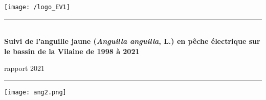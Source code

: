 \documentclass[10pt,twocolumn,titlepage,twoside]{article}\usepackage[]{graphicx}\usepackage[]{color}
\begin{document}
\newpage
{}
\thispagestyle{empty}
\pagecolor{bleu_EV}
\begin{minipage}{\textwidth}
\vspace{30pt}
\hspace{30pt}
\texttt{[image: /logo\_EV1]}
\end{minipage}

\begin{minipage}{0.1\textwidth}
\phantom{This text will be invisible}
\end{minipage}
\begin{minipage}{0.8\textwidth}
\begin{center}
\noindent
{\color{turquoise_EV}\rule{\textwidth}{2.5pt}}\\
\vspace{8mm}
\color{white}
\color{white}
{ \titlefont \huge  \bfseries{Suivi de l'anguille jaune (\textit{Anguilla anguilla}, L.) en pêche
électrique sur le bassin de la Vilaine de 1998 à 2021\\
    }}
\bigskip
{\titlefont  \LARGE rapport 2021\par }
\vspace{4mm}\noindent
{\color{turquoise_EV}\rule{0.9\textwidth}{1.8pt}}\par
\vspace{5mm}
{}
\end{center}
\end{minipage}



\vspace{2cm}%

\begin{minipage}{\textwidth}
\begin{center}
\texttt{[image: ang2.png]}
\end{center}
\end{minipage}

\vspace{2cm}%

\begin{minipage}{0.8\textwidth}
\begin{center}
\end{center}
\end{minipage}
\restoregeometry
\clearpage
\normalsize
\pagecolor{white}
\end{document}
